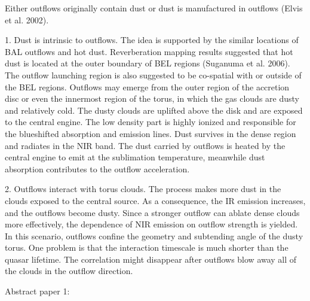Either outflows originally contain dust or dust is manufactured in outflows (Elvis et al. 2002). 

1. Dust is intrinsic to outflows. 
The idea is supported by the similar locations of BAL outflows and hot dust. 
Reverberation mapping results suggested that hot dust is located at the outer boundary of BEL regions (Suganuma et al. 2006). 
The outflow launching region is also suggested to be co-spatial with or outside of the BEL regions. 
Outflows may emerge from the outer region of the accretion disc or even the innermost region of the torus, in which the gas clouds are dusty and relatively cold. 
The dusty clouds are uplifted above the disk and are exposed to the central engine. 
The low density part is highly ionized and responsible for the blueshifted absorption and emission lines. 
Dust survives in the dense region and radiates in the NIR band. 
The dust carried by outflows is heated by the central engine to emit at the sublimation temperature, meanwhile dust absorption contributes to the outflow acceleration. 

2. Outflows interact with torus clouds. 
The process makes more dust in the clouds exposed to the central source. 
As a consequence, the IR emission increases, and the outflows become dusty. 
Since a stronger outflow can ablate dense clouds more effectively, the dependence of NIR emission on outflow strength is yielded. 
In this scenario, outflows confine the geometry and subtending angle of the dusty torus. 
One problem is that the interaction timescale is much shorter than the quasar lifetime. 
The correlation might disappear after outflows blow away all of the clouds in the outflow direction. 


Abstract paper 1: 

